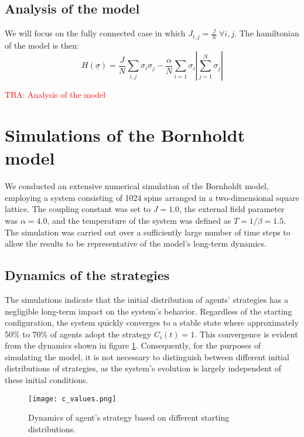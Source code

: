 \subsection{Analysis of the model}
We will focus on the fully connected case in which \(J_{i,j}=\frac{J}{N} \; \forall i,j\). The hamiltonian of the model is then:
\begin{equation}
    H(\underline{\sigma}) = \frac{J}{N}\sum_{i,j}\sigma_i\sigma_j - \frac{\alpha}{N}\sum_{i=1} \sigma_i \left | \sum_{j=1}^N \sigma_j \right |
\end{equation}

\textcolor{red}{TBA: Analysis of the model}

\section{Simulations of the Bornholdt model}
We conducted an extensive numerical simulation of the Bornholdt model, employing a system consisting of 1024 spins arranged in a two-dimensional square lattice. The coupling constant was set to $J=1.0$, the external field parameter was $\alpha=4.0$, and the temperature of the system was defined as $T=1/\beta=1.5$. The simulation was carried out over a sufficiently large number of time steps to allow the results to be representative of the model's long-term dynamics.

\subsection{Dynamics of the strategies}
The simulations indicate that the initial distribution of agents' strategies has a negligible long-term impact on the system's behavior. Regardless of the starting configuration, the system quickly converges to a stable state where approximately 50\% to 70\% of agents adopt the strategy $C_i(t) = 1$. This convergence is evident from the dynamics shown in figure \ref{fig:strategies}. Consequently, for the purposes of simulating the model, it is not necessary to distinguish between different initial distributions of strategies, as the system's evolution is largely independent of these initial conditions.

\begin{figure}[H]
    \centering
    \texttt{[image: c\_values.png]}
    \caption{Dynamics of agent's strategy based on different starting distributions.}
    \label{fig:strategies}
\end{figure}

